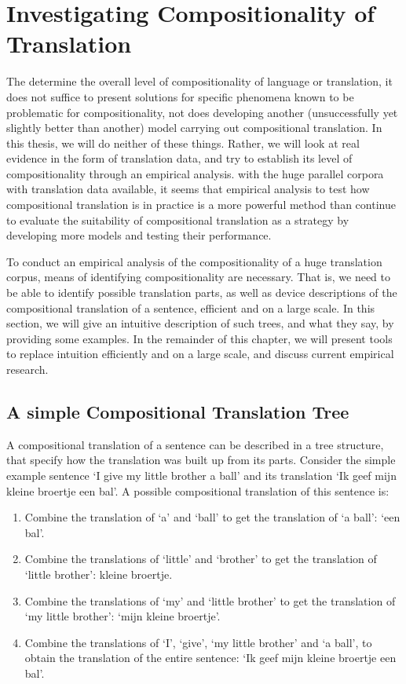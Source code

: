 \documentclass{report}
\begin{document}
 
\section{Investigating Compositionality of Translation}
\label{sec:invest}

The determine the overall level of compositionality of language or translation, it does not suffice to present solutions for specific phenomena known to be problematic for compositionality, not does developing another (unsuccessfully yet slightly better than another) model carrying out compositional translation. In this thesis, we will do neither of these things. Rather, we will look at real evidence in the form of translation data, and try to establish its level of compositionality through an empirical analysis. with the huge parallel corpora with translation data available, it seems that empirical analysis to test how compositional translation is in practice is a more powerful method than continue to evaluate the suitability of compositional translation as a strategy by developing more models and testing their performance. 

To conduct an empirical analysis of the compositionality of a huge translation corpus, means of identifying compositionality are necessary. That is, we need to be able to identify possible translation parts, as well as device descriptions of the compositional translation of a sentence, efficient and on a large scale. In this section, we will give an intuitive description of such trees, and what they say, by providing some examples. In the remainder of this chapter, we will present tools to replace intuition efficiently and on a large scale, and discuss current empirical research.

\subsection{A simple Compositional Translation Tree}

A compositional translation of a sentence can be described in a tree structure, that specify how the translation was built up from its parts. Consider the simple example sentence `I give my little brother a ball' and its translation `Ik geef mijn kleine broertje een bal'. A possible compositional translation of this sentence is:\begin{enumerate}
\item Combine the translation of `a' and `ball' to get the translation of `a ball': `een bal'.
\item Combine the translations of `little' and `brother' to get the translation of `little brother': kleine broertje.
\item Combine the translations of `my' and `little brother' to get the translation of `my little brother': `mijn kleine broertje'.
\item Combine the translations of `I', `give', `my little brother' and `a ball', to obtain the translation of the entire sentence: `Ik geef mijn kleine broertje een bal'.
\end{enumerate}
\end{document}
